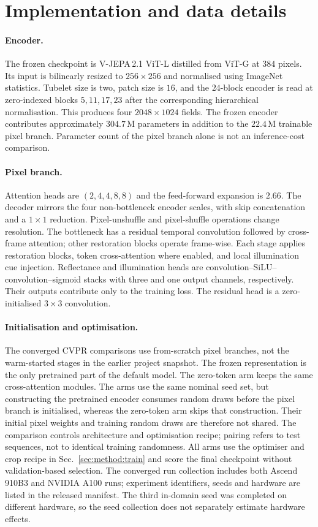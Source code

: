 \section{Implementation and data details}\label{app:impl}

\paragraph{Encoder.}
The frozen checkpoint is V-JEPA\,2.1 ViT-L distilled from ViT-G at
$384$ pixels. Its input is bilinearly resized to $256\times256$ and
normalised using ImageNet statistics. Tubelet size is two, patch size is
$16$, and the $24$-block encoder is read at zero-indexed blocks
$5,11,17,23$ after the corresponding hierarchical normalisation.
This produces four $2048\times1024$ fields.
The frozen encoder contributes approximately $304.7$\,M parameters in
addition to the $22.4$\,M trainable pixel branch.
Parameter count of the pixel branch alone is not an inference-cost comparison.

\paragraph{Pixel branch.}
Attention heads are $(2,4,4,8,8)$ and the feed-forward expansion is $2.66$.
The decoder mirrors the four non-bottleneck encoder scales, with skip
concatenation and a $1\times1$ reduction.
Pixel-unshuffle and pixel-shuffle operations change resolution.
The bottleneck has a residual temporal convolution followed by cross-frame
attention; other restoration blocks operate frame-wise.
Each stage applies restoration blocks, token cross-attention where enabled,
and local illumination cue injection.
Reflectance and illumination heads are convolution--SiLU--convolution--sigmoid
stacks with three and one output channels, respectively. Their outputs
contribute only to the training loss.
The residual head is a zero-initialised $3\times3$ convolution.

\paragraph{Initialisation and optimisation.}\label{app:stages}
The converged CVPR comparisons use from-scratch pixel branches, not the
warm-started stages in the earlier project snapshot.
The frozen representation is the only pretrained part of the default model.
The zero-token arm keeps the same cross-attention modules.
The arms use the same nominal seed set, but constructing the pretrained
encoder consumes random draws before the pixel branch is initialised,
whereas the zero-token arm skips that construction. Their initial pixel
weights and training random draws are therefore not shared.
The comparison controls architecture and optimisation recipe; pairing refers
to test sequences, not to identical training randomness.
All arms use the optimiser and crop recipe in Sec.~\ref{sec:method:train}
and score the final checkpoint without validation-based selection.
The converged run collection includes both Ascend 910B3 and NVIDIA A100
runs; experiment identifiers, seeds and hardware are listed in the released
manifest. The third in-domain seed was completed on different hardware, so
the seed collection does not separately estimate hardware effects.

